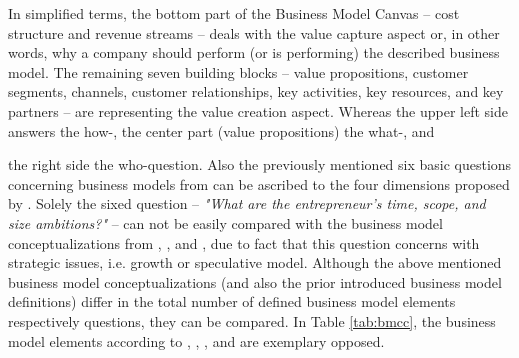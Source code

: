 In simplified terms, the bottom part of the Business Model Canvas -- cost structure and revenue streams -- deals with the value capture aspect or, in other words, why a company should perform (or is performing) the described business model. The remaining seven building blocks -- value propositions, customer segments, channels, customer relationships, key activities, key resources, and key partners -- are representing the value creation aspect. Whereas the upper left side answers the how-, the center part (value propositions) the what-, and\linebreak 
\vspace*{-\baselineskip}
 
\noindent
the right side the who-question. Also the previously mentioned six basic questions concerning business models from \citet[pp. 729-732]{Morris2005} can be ascribed to the four dimensions proposed by \citet{Frankenberger2013}. Solely the sixed question -- \textit{"What are the entrepreneur's time, scope, and size ambitions?"} -- can not be easily compared with the business model conceptualizations from \citet{Johnson2008}, \citet{Osterwalder2010}, and \citet{Frankenberger2013}, due to fact that this question concerns with strategic issues, i.e. growth or speculative model. Although the above mentioned business model conceptualizations (and also the prior introduced business model definitions) differ in the total number of defined business model elements respectively questions, they can be compared. In Table \ref{tab:bmcc}, the business model elements according to \citet{Johnson2008}, \citet{Osterwalder2010}, \citet{Morris2005}, and \citet{Frankenberger2013} are exemplary opposed.

